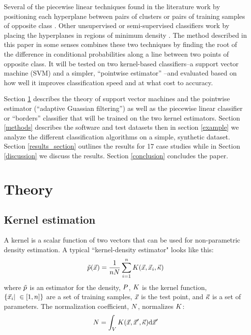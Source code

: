 Several of the piecewise linear techniques found in the literature work by
positioning each hyperplane between pairs of clusters or pairs of training
samples of opposite class 
\citep{Sklansky_Michelotti1980, Tenmoto_etal1998, Kostin2006, Gai_Zhang2010}.
Other unsupervised or semi-supervised classifiers work by placing the 
hyperplanes in regions of minimum density \citep{Pavlidis_etal2016}.
The method described in this paper in some senses combines these two techniques
by finding the root of the difference in conditional probabilities along a
line between two points of opposite class.
It will be tested on two kernel-based classifiers--a support vector
machine (SVM) \citep{Michie_etal1994, Mueller_etal2001}
and a simpler, ``pointwise estimator'' \citep{Terrell_Scott1992, Mills2011}--and evaluated based on how
well it improves classification speed and at what cost to accuracy.

Section \ref{theory} describes the theory of support
vector machines and the pointwise estimator (``adaptive Guassian filtering'')
as well as the piecewise linear classifier or ``borders'' classifier
that will be trained on the two kernel estimators.
Section \ref{methods} describes the software and test datasets then in
section \ref{example} we analyze the different classification algorithms on
a simple, synthetic dataset.
Section \ref{results_section} outlines the results for 17 case studies
while in Section \ref{discussion} we discuss the results.
Section \ref{conclusion} concludes the paper.

\section{Theory}

\label{theory}

\subsection{Kernel estimation}

A kernel is a scalar function of two vectors that can be used for 
non-parametric density estimation. A typical ``kernel-density estimator"
looks like this:
\begin{equation}
	\tilde p(\vec {x}) = \frac {1}{n N} \sum_{i=1}^n K(\vec {x}, \vec {x}_i, \vec \kappa)
	\label{kernel_estimator}
\end{equation}
where $\tilde p$ is an estimator for the density, $P$, 
$K$ is the kernel function,
$\lbrace \vec {x}_i | ~ \in [1,n] \rbrace$ are a set of training samples, 
$\vec {x}$ is the test point,
and $\vec \kappa$ is a set of parameters. 
The normalization coefficient, $N$, normalizes $K$:
\begin{equation}
	N = \int_V K(\vec {x}, \vec {x}^\prime, \vec \kappa) \mathrm d \vec {x}^\prime
	\label{norm_def}
\end{equation}

